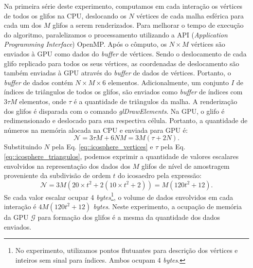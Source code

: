 Na primeira série deste experimento, computamos em cada interação os vértices de todos os glifos na CPU, deslocando os $N$ vértices de cada malha esférica para cada um dos $M$ glifos a serem renderizados. Para melhorar o tempo de execução do algoritmo, paralelizamos o processamento utilizando a API (\textit{Application Programming Interface}) OpenMP. Após o cômputo, os $N\times M$ vértices são enviados à GPU como dados do \textit{buffer} de vértices. Sendo o deslocamento de cada glifo replicado para todos os seus vértices, as coordenadas de deslocamento são também enviadas à GPU  através do \textit{buffer} de dados de vértices. Portanto, o \textit{buffer} de dados contém $N\times M \times 6$ elementos.
Adicionalmente, um conjunto $I$ de índices de triângulos de todos os glifos, são enviados como \textit{buffer} de índices com $3\tau M$ elementos, onde $\tau$ é a quantidade de triângulos da malha. A renderização dos glifos é disparada com o comando \textit{glDrawElements}. Na GPU, o glifo é redimensionado e deslocado para sua respectiva célula. Portanto, a quantidade de números na memória alocada na CPU e enviada para GPU é:
\begin{equation}
\label{eq::mem_odfs_trafego_1.1}
    \mathscr{N} =  3\tau M + 6NM = 3M(\tau + 2N).
\end{equation}
Substituindo $N$ pela Eq. \ref{eq::icosphere_vertices} e $\tau$ pela Eq. \ref{eq::icosphere_triangulos}, podemos exprimir a quantidade de valores escalares envolvidos na representação dos dados dos $M$ glifos de nível de amostragem proveniente da subdivisão de ordem $t$ do icosaedro pela expressão:
\begin{equation}
\label{eq::mem_odfs_trafego_1.2}
    \mathscr{N} = 3M( 20\times t^2 + 2(10\times t^2 +2)) = M(120t^2 + 12).
\end{equation}
Se cada valor escalar ocupar 4 \textit{bytes}\footnote{No experimento, utilizamos pontos flutuantes para descrição dos vértices e inteiros sem sinal para índices. Ambos ocupam 4 \textit{bytes}.}, o volume de dados envolvidos em cada interação é $4M(120t^2 + 12)$ \textit{bytes}. Neste experimento, a ocupação de memória da GPU $\mathscr{G}$ para formação dos glifos é a mesma da quantidade dos dados enviados.

